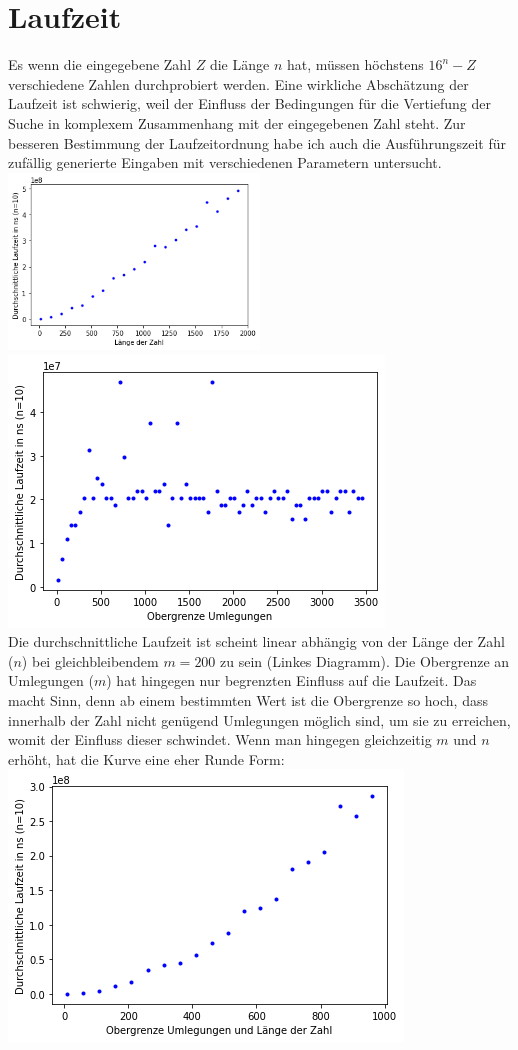 \documentclass[a4paper,10pt,ngerman]{scrartcl}
\begin{document}
\section{Laufzeit}
Es wenn die eingegebene Zahl $Z$ die Länge $n$ hat, müssen höchstens $16^n-Z$ verschiedene Zahlen durchprobiert werden. Eine wirkliche Abschätzung der Laufzeit ist schwierig, weil der Einfluss der Bedingungen für die Vertiefung der Suche in komplexem Zusammenhang mit der eingegebenen Zahl steht. Zur besseren Bestimmung der Laufzeitordnung habe ich auch die Ausführungszeit für zufällig generierte Eingaben mit verschiedenen Parametern untersucht. \\
\includegraphics[width=0.5\textwidth]{laufzeit1} \includegraphics[width=.5\textwidth]{laufzeit2} \\
Die durchschnittliche Laufzeit ist scheint linear abhängig von der Länge der Zahl ($n$) bei gleichbleibendem $m=200$ zu sein (Linkes Diagramm). Die Obergrenze an Umlegungen ($m$) hat hingegen nur begrenzten Einfluss auf die Laufzeit. Das macht Sinn, denn ab einem bestimmten Wert ist die Obergrenze so hoch, dass innerhalb der Zahl nicht genügend Umlegungen möglich sind, um sie zu erreichen, womit der Einfluss dieser schwindet. Wenn man hingegen gleichzeitig $m$ und $n$ erhöht, hat die Kurve eine eher Runde Form: \\
\includegraphics[scale=.5]{laufzeit3}\\
\end{document}
